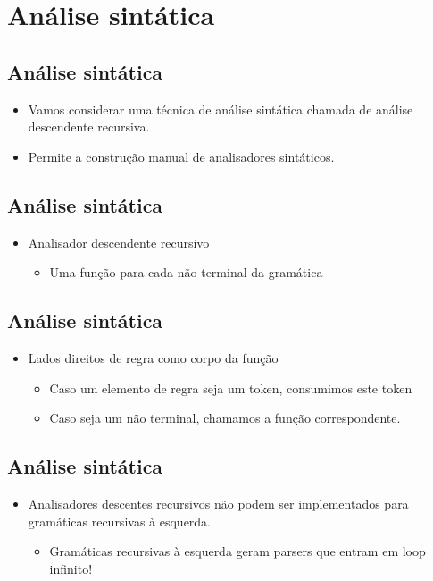 \documentclass[11pt]{article}
\begin{document}
\section*{Análise sintática}
\label{sec:org2416232}

\subsection*{Análise sintática}
\label{sec:org824b457}

\begin{itemize}
\item Vamos considerar uma técnica de análise sintática chamada de análise descendente recursiva.
\item Permite a construção manual de analisadores sintáticos.
\end{itemize}
\subsection*{Análise sintática}
\label{sec:org2de1ce6}

\begin{itemize}
\item Analisador descendente recursivo 
\begin{itemize}
\item Uma função para cada não terminal da gramática
\end{itemize}
\end{itemize}
\subsection*{Análise sintática}
\label{sec:org3a3a118}

\begin{itemize}
\item Lados direitos de regra como corpo da função 
\begin{itemize}
\item Caso um elemento de regra seja um token, consumimos este token
\item Caso seja um não terminal, chamamos a função correspondente.
\end{itemize}
\end{itemize}
\subsection*{Análise sintática}
\label{sec:org6582ee3}

\begin{itemize}
\item Analisadores descentes recursivos não podem ser implementados para gramáticas recursivas à esquerda.
\begin{itemize}
\item Gramáticas recursivas à esquerda geram parsers que entram em loop infinito!
\end{itemize}
\end{itemize}
\end{document}
